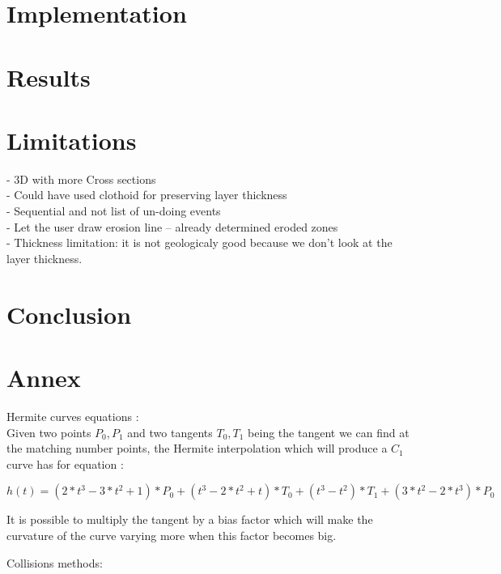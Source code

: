\documentclass[12pt, a4paper]{memoir} %
\begin{document}
\section{Implementation}

\section{Results}
\section{Limitations}
- 3D with more Cross sections\\
- Could have used clothoid for preserving layer thickness\\
- Sequential and not list of un-doing events\\
- Let the user draw erosion line -- already determined eroded zones\\
- Thickness limitation: it is not geologicaly good because we don't look at the layer thickness.
\section{Conclusion}



\section{Annex}

Hermite curves equations :\\
Given two points $P_0, P_1$ and two tangents $T_0, T_1$ being the tangent we can find at the matching number points, the Hermite interpolation which will produce a $C_1$ curve has for equation : 


\begin{equation}
h(t) = (2*t^3 - 3*t^2 + 1)*P_0 + (t^3 - 2*t^2 + t)*T_0 + (t^3 -t^2)*T_1 +(3*t^2 - 2*t^3)*P_0
\end{equation}

It is possible to multiply the tangent by a bias factor which will make the curvature of the curve varying more when this factor becomes big.

Collisions methods: \\
\end{document}
